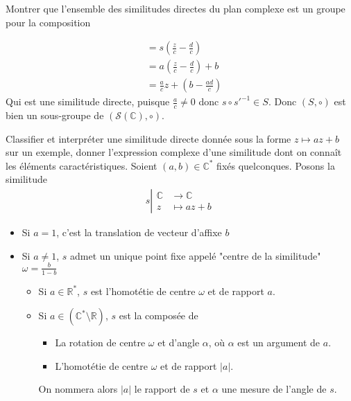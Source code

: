 \documentclass{article}
\begin{document}
\begin{question_kholle}{Montrer que l'ensemble des similitudes directes du plan complexe est un groupe pour la composition}
\begin{itemize}[label=$\lozenge$]
\begin{align*}
			                           & = s\left(\frac{z}{c} - \frac{d}{c}\right)        \\
			                           & = a\left(\frac{z}{c} - \frac{d}{c}\right) + b    \\
			                           & = \frac{a}{c}z + \left( b - \frac{ad}{c} \right)
		      \end{align*}
		      Qui est une similitude directe, puisque $\frac{a}{c} \neq  0$ donc $s \circ s'^{-1} \in S$. Donc $(S, \circ)$ est bien un sous-groupe de $(\mathcal{S}(\mathbb{C}), \circ)$.
	\end{itemize}
\end{question_kholle}

\begin{question_kholle}{Classifier et interpréter une similitude directe donnée sous la forme $z \mapsto a z + b$ sur un exemple, donner l'expression complexe d'une similitude dont on connaît les éléments caractéristiques.}
	Soient $(a, b) \in \mathbb{C}^*$ fixés quelconques. Posons la similitude
	\begin{align*}
		s \left| \begin{array}{ll}
			         \mathbb{C} & \to \mathbb{C}  \\
			         z          & \mapsto a z + b
		         \end{array}\right.
	\end{align*}
	\begin{itemize}[label=$\lozenge$]
		\item Si $a = 1$, c'est la translation de vecteur d'affixe $b$
		\item Si $a \neq 1$, $s$ admet un unique point fixe appelé "centre de la similitude" $\omega = \frac{b}{1-b}$
		      \begin{itemize}[label=$\star$]
			      \item Si $a \in \mathbb{R}^*$, $s$ est l'homotétie de centre $\omega$ et de rapport $a$.
			      \item Si $a \in (\mathbb{C}^* \setminus \mathbb{R})$, $s$ est la composée de
			            \begin{itemize}
				            \item La rotation de centre $\omega$ et d'angle $\alpha$, où $\alpha$ est un argument de $a$.
				            \item L'homotétie de centre $\omega$ et de rapport $|a|$.
			            \end{itemize}
			            On nommera alors $|a|$ le rapport de $s$ et $\alpha$ une mesure de l'angle de $s$.

\end{itemize}
\end{itemize}
\end{question_kholle}
\end{document}
